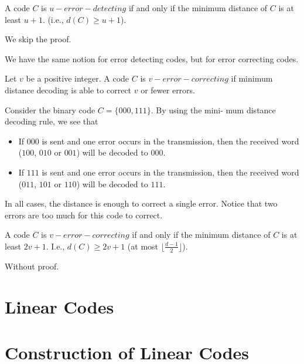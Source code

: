 \begin{theorem}
    A code $C$ is $u-error-detecting$ if and only if the minimum
     distance of $C$ is at least $u+1$.
    (i.e., $d(C)\ge u+1$).
\end{theorem}
We skip the proof.


We have the same notion for error detecting codes, but for error correcting codes.
\begin{definition}
Let $v$ be a positive integer. A code $C$ is $v-error-correcting$
if minimum distance decoding is able to correct $v$ or fewer errors.
\end{definition}

\begin{example}
    Consider the binary code $C = \{000, 111\}$. By using the mini-
mum distance decoding rule, we see that
\begin{itemize}
    \item If $000$ is sent and one error occurs in the transmission, then the received word
    ($100$, $010$ or $001$) will be decoded to $000$.
    \item If $111$ is sent and one error occurs in the transmission, then the received word
    ($011$, $101$ or $110$) will be decoded to $111$.
\end{itemize}

In all cases, the distance is enough to correct a single error. Notice that two errors 
are too much for this code to correct.
\end{example}

\begin{theorem}
    A code $C$ is $v-error-correcting$ if and only if the minimum distance of $C$ is at least $2v+1$.
    I.e., $d(C)\ge 2v+1$ (at most $\lfloor \frac{d-1}{2}\rfloor$).
\end{theorem}

Without proof.


\section{Linear Codes}


\section{Construction of Linear Codes}

